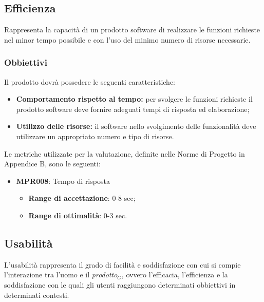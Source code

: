 \subsection{Efficienza}
Rappresenta la capacità di un prodotto software di realizzare le funzioni richieste nel minor tempo possibile e con l'uso del minimo numero di risorse necessarie. 
\subsubsection{Obbiettivi } Il prodotto dovrà possedere le seguenti caratteristiche:
\begin{itemize}
	\item \textbf{Comportamento rispetto al tempo:} per svolgere le  funzioni richieste il prodotto software deve fornire adeguati tempi di risposta ed elaborazione;
	\item \textbf{Utilizzo delle risorse:} il software nello svolgimento delle funzionalità deve utilizzare un appropriato numero e tipo di risorse.
\end{itemize}
Le metriche utilizzate per la valutazione, definite nelle Norme di Progetto in Appendice B, sono le seguenti:
\begin{itemize}
	\item \textbf{MPR008}: Tempo di risposta
	\begin{itemize}
		\item \textbf{Range di accettazione}: 0-8 sec;
		\item \textbf{Range di ottimalità}: 0-3 sec.
	\end{itemize}
\end{itemize}

\subsection{Usabilità}
L'usabilità rappresenta il grado di facilità e soddisfazione con cui si compie l'interazione tra l'uomo e il \textit{prodotto$_{G}$}, ovvero l'efficacia, l'efficienza e la soddisfazione con le quali gli utenti raggiungono determinati obbiettivi in determinati contesti.
